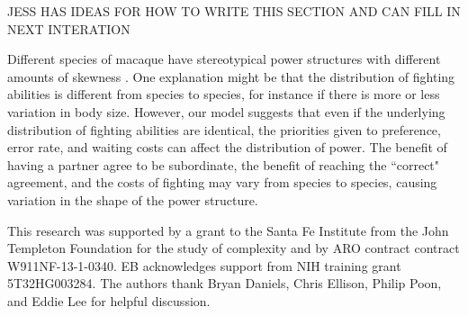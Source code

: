 \documentclass{pnastwo}
\begin{document}
\begin{article}
JESS HAS IDEAS FOR HOW TO WRITE THIS SECTION AND CAN FILL IN NEXT INTERATION

Different species of macaque have stereotypical power structures with different amounts of skewness \cite{Flack:2004oq,Preuschoft:2004ly,Waal:1985fk}.  One explanation might be that the distribution of fighting abilities is different from species to species, for instance if there is more or less variation in body size.  However, our model suggests that even if the underlying distribution of fighting abilities are identical, the priorities given to preference, error rate, and waiting costs can affect the distribution of power.  The benefit of having a partner agree to be subordinate, the benefit of reaching the ``correct" agreement, and the costs of fighting may vary from species to species, causing variation in the shape of the power structure.

\begin{acknowledgments}
This research was supported by a grant to the Santa Fe Institute from the John Templeton Foundation for the study of complexity and by ARO contract contract W911NF-13-1-0340. EB acknowledges support from NIH training grant 5T32HG003284. The authors thank Bryan Daniels, Chris Ellison, Philip Poon, and Eddie Lee for helpful discussion. 
\end{acknowledgments}

%  



\end{article}
\end{document}
